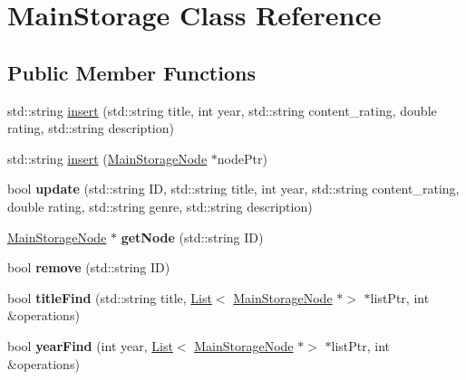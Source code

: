 \hypertarget{class_main_storage}{}\section{Main\+Storage Class Reference}
\label{class_main_storage}
\subsection*{Public Member Functions}
\begin{DoxyCompactItemize}
\item 
std\+::string \hyperlink{class_main_storage_a53e44d67b847b1195ca9aa444333886f}{insert} (std\+::string title, int year, std\+::string content\+\_\+rating, double rating, std\+::string description)
\item 
std\+::string \hyperlink{class_main_storage_a474a036747ca2b6e9082e199eea14510}{insert} (\hyperlink{class_main_storage_node}{Main\+Storage\+Node} $\ast$node\+Ptr)
\item 
\mbox{\label{class_main_storage_a671382444b8ef74cee4f40b250abf48c}} 
bool {\bfseries update} (std\+::string ID, std\+::string title, int year, std\+::string content\+\_\+rating, double rating, std\+::string genre, std\+::string description)
\item 
\mbox{\label{class_main_storage_a2b4e41b68af000474264b89e37fe2c07}} 
\hyperlink{class_main_storage_node}{Main\+Storage\+Node} $\ast$ {\bfseries get\+Node} (std\+::string ID)
\item 
\mbox{\label{class_main_storage_a673ae2af870359aaaf9ae60a4be4974d}} 
bool {\bfseries remove} (std\+::string ID)
\item 
\mbox{\label{class_main_storage_a76cc264ecdf371b16ebf57bd3be1476e}} 
bool {\bfseries title\+Find} (std\+::string title, \hyperlink{class_list}{List}$<$ \hyperlink{class_main_storage_node}{Main\+Storage\+Node} $\ast$$>$ $\ast$list\+Ptr, int \&operations)
\item 
\mbox{\label{class_main_storage_a7e97295155ad6b7b4d4d77bd210f10cc}} 
bool {\bfseries year\+Find} (int year, \hyperlink{class_list}{List}$<$ \hyperlink{class_main_storage_node}{Main\+Storage\+Node} $\ast$$>$ $\ast$list\+Ptr, int \&operations)

\end{DoxyCompactItemize}
